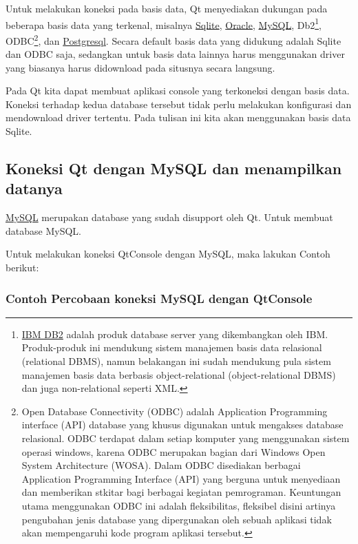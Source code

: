 Untuk melakukan koneksi pada basis data, Qt menyediakan dukungan pada
beberapa basis data yang terkenal, misalnya
\href{https://www.sqlite.org/about.html}{Sqlite},
\href{https://en.wikipedia.org/wiki/Oracle_Database}{Oracle},
\href{https://www.mysql.com/about/}{MySQL}, Db2\footnote{\href{https://en.wikipedia.org/wiki/IBM_DB2}{IBM
  DB2} adalah produk database server yang dikembangkan oleh IBM.
  Produk-produk ini mendukung sistem manajemen basis data relasional
  (relational DBMS), namun belakangan ini sudah mendukung pula sistem
  manajemen basis data berbasis object-relational (object-relational
  DBMS) dan juga non-relational seperti XML.}, ODBC\footnote{Open
  Database Connectivity (ODBC) adalah Application Programming interface
  (API) database yang khusus digunakan untuk mengakses database
  relasional. ODBC terdapat dalam setiap komputer yang menggunakan
  sistem operasi windows, karena ODBC merupakan bagian dari Windows Open
  System Architecture (WOSA). Dalam ODBC disediakan berbagai Application
  Programming Interface (API) yang berguna untuk menyediaan dan
  memberikan stkitar bagi berbagai kegiatan pemrograman. Keuntungan
  utama menggunakan ODBC ini adalah fleksibilitas, fleksibel disini
  artinya pengubahan jenis database yang dipergunakan oleh sebuah
  aplikasi tidak akan mempengaruhi kode program aplikasi tersebut.}, dan
\href{https://id.wikipedia.org/wiki/PostgreSQL}{Postgresql}. Secara
default basis data yang didukung adalah Sqlite dan ODBC saja, sedangkan
untuk basis data lainnya harus menggunakan driver yang biasanya harus
didownload pada situsnya secara langsung.

Pada Qt kita dapat membuat aplikasi console yang terkoneksi dengan basis
data. Koneksi terhadap kedua database tersebut tidak perlu melakukan
konfigurasi dan mendownload driver tertentu. Pada tulisan ini kita akan
menggunakan basis data Sqlite.

\subsection{Koneksi Qt dengan MySQL dan menampilkan
datanya}\label{koneksi-qt-dengan-mysql-dan-menampilkan-datanya}

\href{https://www.mysql.com/}{MySQL} merupakan database yang sudah
disupport oleh Qt. Untuk membuat database MySQL.

Untuk melakukan koneksi QtConsole dengan MySQL, maka lakukan Contoh
berikut:

\subsubsection*{Contoh Percobaan koneksi MySQL dengan QtConsole}

